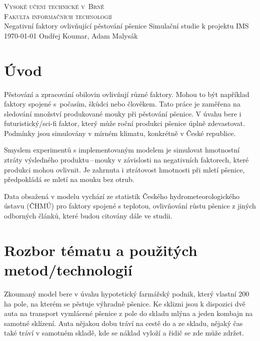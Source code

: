 \documentclass[a4paper, 11pt, hidelinks]{article}
\begin{document}
\begin{titlepage}
    \begin{center}
        \Huge \textsc{Vysoké učení technické v~Brně} \\
        \huge \textsc{Fakulta informačních technologií} \\
        \Huge Negativní faktory ovlivňující pěstování pšenice
        \huge Simulační studie k projektu IMS\\
        \Large \today{} \hfill Ondřej Koumar, Adam Malysák
    \end{center}
\end{titlepage}

\tableofcontents

\newpage

\section*{Úvod}\label{0_uvod}

Pěstování a zpracování obilovin ovlivňují různé faktory.
Mohou to být například faktory spojené s~počasím, škůdci nebo člověkem.
Tato práce je zaměřena na sledování množství produkované mouky při pěstování pšenice.
V úvahu bere i futuristický/sci-fi faktor, který může roční produkci pšenice úplně zdevastovat.
Podmínky jsou simulovány v mírném klimatu, konkrétně v České republice.

Smyslem experimentů s implementovaným modelem je simulovat hmotnostní ztráty výsledného produktu\,--\,mouky
v závislosti na negativních faktorech, které produkci mohou ovlivnit.
Je zahrnuta i ztrátovost hmotnosti při mletí pšenice, předpokládá se mletí na mouku bez otrub.

Data obsažená v modelu vychází ze statistik Českého hydrometeorologického ústavu (ČHMÚ)\cite{CHMU} pro faktory spojené
s teplotou, ovlivňování růstu pšenice z jiných odborných článků, které budou citovány dále ve studii.

\section{Rozbor tématu a použitých metod/technologií}\label{1_rozbor}

Zkoumaný model bere v úvahu hypotetický farmářský podnik, který vlastní 200\,ha pole, na kterém se pěstuje výhradně pšenice.
Ke sklizni jsou k dispozici dvě auta na transport vymlácené pšenice z pole do skladu mlýna a jeden kombajn na samotné sklízení.
Auta nějakou dobu tráví na cestě do a ze skladu, nějaký čas také tráví v samotném skladě, kde se náklad vyloží a řidič se zde může zdržet.
\end{document}
